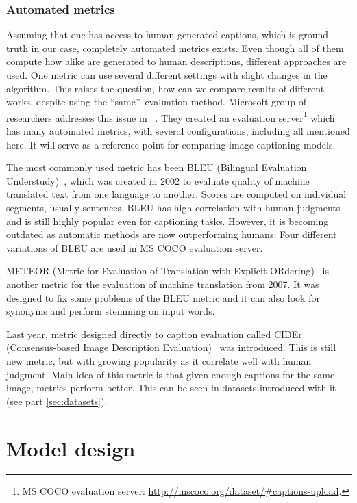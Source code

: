 		\subsection{Automated metrics}

Assuming that one has access to human generated captions, which is ground truth in our case, completely automated metrics exists. Even though all of them compute how alike are generated to human descriptions, different approaches are used. One metric can use several different settings with slight changes in the algorithm. This raises the question, how can we compare results of different works, despite using the \textquotedblleft same\textquotedblright \ evaluation method. Microsoft group of researchers addresses this issue in ~\cite{DBLP:journals/corr/ChenFLVGDZ15}. They created an evaluation server\footnote{MS COCO evaluation server: \url{http://mscoco.org/dataset/\#captions-upload}.} which has many automated metrics, with several configurations, including all mentioned here. It will serve as a reference point for comparing image captioning models.

The most commonly used metric has been BLEU (Bilingual Evaluation Understudy)~\cite{Papineni:2002:BMA:1073083.1073135}, which was created in 2002 to evaluate quality of machine translated text from one language to another. Scores are computed on individual segments, usually sentences. BLEU has high correlation with human judgments and is still highly popular even for captioning tasks. However, it is becoming outdated as automatic methods are now outperforming humans. Four different variations of BLEU are used in MS COCO evaluation server.

METEOR (Metric for Evaluation of Translation with Explicit ORdering)~\cite{Lavie:2007:MAM:1626355.1626389} is another metric for the evaluation of machine translation from 2007. It was designed to fix some problems of the BLEU metric and it can also look for synonyms and perform stemming on input words.

Last year, metric designed directly to caption evaluation called CIDEr (Consensus-based Image Description Evaluation)~\cite{Vedantam_2015_CVPR} was introduced. This is still new metric, but with growing popularity as it correlate well with human judgment. Main idea of this metric is that given enough captions for the same image, metrics perform better. This can be seen in datasets introduced with it (see part \ref{sec:datasets}).

\chapter{Model design}\label{chp:model}

